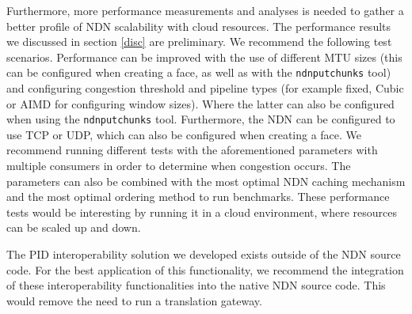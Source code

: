 Furthermore, more performance measurements and analyses is needed to gather a better profile of NDN scalability with cloud resources. The performance results we discussed in section \ref{disc} are preliminary. We recommend the following test scenarios. Performance can be improved with the use of different MTU sizes (this can be configured when creating a face, as well as with the \texttt{ndnputchunks} tool) and configuring congestion threshold and pipeline types (for example fixed, Cubic or AIMD for configuring window sizes). Where the latter can also be configured when using the \texttt{ndnputchunks} tool. Furthermore, the NDN can be configured to use TCP or UDP, which can also be configured when creating a face. We recommend running different tests with the aforementioned parameters with multiple consumers in order to determine when congestion occurs. The parameters can also be combined with the most optimal NDN caching mechanism and the most optimal ordering method \cite{koulouzis2018information} to run benchmarks. These performance tests would be interesting by running it in a cloud environment, where resources can be scaled up and down.


The PID interoperability solution we developed exists outside of the NDN source code. For the best application of this functionality, we recommend the integration of these interoperability functionalities into the native NDN source code. This would remove the need to run a translation gateway.


